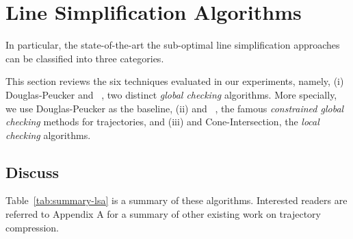 \newtheorem{theorem}{Theorem}
\newtheorem{lemma}{Lemma}

\vspace{-1ex}
\section{Line Simplification Algorithms}
\label{sec-lsa}

In particular, the state-of-the-art the sub-optimal line simplification approaches can be classified into three categories.



This section reviews the six techniques evaluated in our experiments, namely,
(i) Douglas-Peucker\cite{Douglas:Peucker} and \pavlidis~\cite{Pavlidis:Segment}, two distinct \emph{global checking} algorithms.
More specially, we use Douglas-Peucker as the baseline,
(ii) \bqsa\cite{Liu:BQS} and \squishe~\cite{Muckell:SQUISH}, the famous \emph{constrained global checking} methods for trajectories, %
and (iii) \operb\cite{Lin:Operb} and Cone-Intersection\cite{Williams:Longest,Sklansky:Cone,Dunham:Cone, Zhao:Sleeve}, the \emph{local checking} algorithms.







\subsection{Discuss}

Table~\ref{tab:summary-lsa} is a summary of these algorithms.
Interested readers are referred to Appendix A for a summary of other existing work on trajectory compression.


